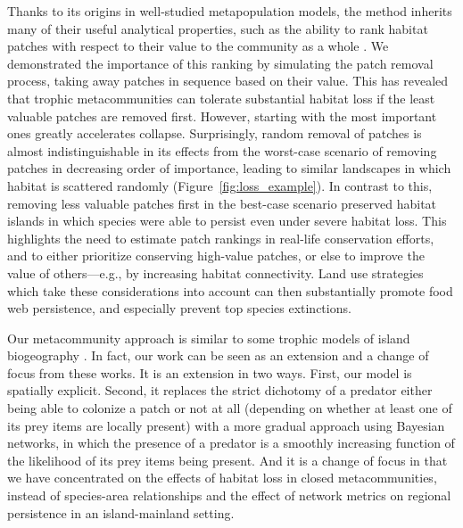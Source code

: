 \documentclass[11pt]{article}
\begin{document}
Thanks to its origins in well-studied metapopulation models, the method inherits many of their useful analytical properties, such as the ability to rank habitat patches with respect to their value to the community as a whole \citep{OvaskainenHanski2001}. We demonstrated the importance of this ranking by simulating the patch removal process, taking away patches in sequence based on their value. This has revealed that trophic metacommunities can tolerate substantial habitat loss if the least valuable patches are removed first. However, starting with the most important ones greatly accelerates collapse. Surprisingly, random removal of patches is almost indistinguishable in its effects from the worst-case scenario of removing patches in decreasing order of importance, leading to similar landscapes in which habitat is scattered randomly (Figure~\ref{fig:loss_example}). In contrast to this, removing less valuable patches first in the best-case scenario preserved habitat islands in which species were able to persist even under severe habitat loss. This highlights the need to estimate patch rankings in real-life conservation efforts, and to either prioritize conserving high-value patches, or else to improve the value of others---e.g., by increasing habitat connectivity. Land use strategies which take these considerations into account can then substantially promote food web persistence, and especially prevent top species extinctions.

Our metacommunity approach is similar to some trophic models of island biogeography \citep{Holt2009, Gravel2011PONE, Gravel2011ELE}. In fact, our work can be seen as an extension and a change of focus from these works. It is an extension in two ways. First, our model is spatially explicit. Second, it replaces the strict dichotomy of a predator either being able to colonize a patch or not at all (depending on whether at least one of its prey items are locally present) with a more gradual approach using Bayesian networks, in which the presence of a predator is a smoothly increasing function of the likelihood of its prey items being present. And it is a change of focus in that we have concentrated on the effects of habitat loss in closed metacommunities, instead of species-area relationships and the effect of network metrics on regional persistence in an island-mainland setting.
\end{document}
